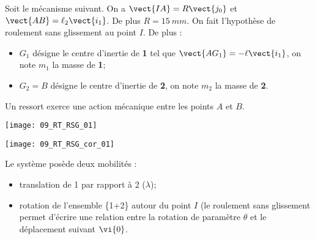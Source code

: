 \normalfalse \difficiletrue \tdifficilefalse
\correctiontrue

\setcounter{question}{0}
\ifcorrection
\else
{}
\fi

\ifprof
\else
Soit le mécanisme suivant. On a $\vect{IA}=R\vect{j_0}$ et $\vect{AB}=\ell_2\vect{i_1}$. De plus $R=\SI{15}{mm}$.
On fait l'hypothèse de roulement sans glissement au point $I$. De plus :
\begin{itemize}
\item $G_1$ désigne le centre d'inertie de \textbf{1} tel que $\vect{AG_1}=-\ell\vect{i_1}$, on note $m_1$ la masse de \textbf{1};%
\item $G_2=B$ désigne le centre d'inertie de \textbf{2}, on note $m_2$ la masse de \textbf{2}.%
\end{itemize}
Un ressort exerce une action mécanique entre les points $A$ et $B$. 
\begin{center}
\texttt{[image: 09\_RT\_RSG\_01]}
\end{center}
\fi

\ifprof
\begin{center}
\texttt{[image: 09\_RT\_RSG\_cor\_01]}
\end{center}

\else
\fi

\ifprof
Le système posède deux mobilités : 
\begin{itemize}
\item translation de 1 par rapport à 2 ($\lambda$);
\item rotation de l'ensemble \{1+2\} autour du point $I$ (le roulement sans glissement permet d'écrire une relation entre la rotation de paramètre $\theta$ et le déplacement suivant $\vi{0}$.
\end{itemize}

